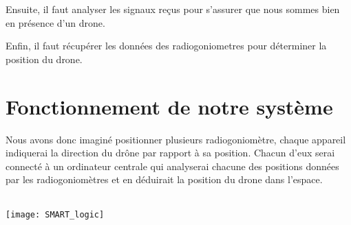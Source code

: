 Ensuite, il faut analyser les signaux reçus pour s'assurer que nous sommes bien en présence d'un drone.

Enfin, il faut récupérer les données des radiogoniometres pour déterminer la position du drone.


\section{Fonctionnement de notre système}

Nous avons donc imaginé positionner plusieurs radiogoniomètre, chaque appareil indiquerai la direction du drône par rapport à sa position. Chacun d'eux serai connecté à un ordinateur centrale qui analyserai chacune des positions données par les radiogoniomètres et en déduirait la position du drone dans l'espace.

~\\

\texttt{[image: SMART\_logic]}





